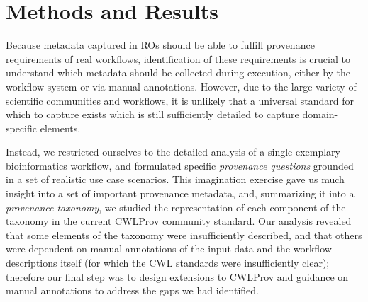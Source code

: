 \section{Methods and Results} 
\label{sec:renske:taxonomy}
Because metadata captured in ROs should be able to fulfill provenance requirements of real workflows, identification of these requirements is crucial to understand which metadata should be collected during execution, either by the workflow system or via manual annotations. However, due to the large variety of scientific communities and workflows, it is unlikely that a universal standard for which to capture exists which is still sufficiently detailed to capture domain-specific elements. 

Instead, we restricted ourselves to the detailed analysis of a single exemplary bioinformatics workflow, and formulated specific \emph{provenance questions} grounded in a set of realistic use case scenarios.
This imagination exercise gave us much insight into a set of important provenance metadata, and, summarizing it into a \emph{provenance taxonomy}, we studied the representation of each component of the taxonomy in the current CWLProv community standard. 
Our analysis revealed that some elements of the taxonomy were insufficiently described, and that others were dependent on manual annotations of the input data and the workflow descriptions itself (for which the CWL standards were insufficiently clear); therefore our final step was to design extensions to CWLProv and guidance on manual annotations to address the gaps we had identified. 


